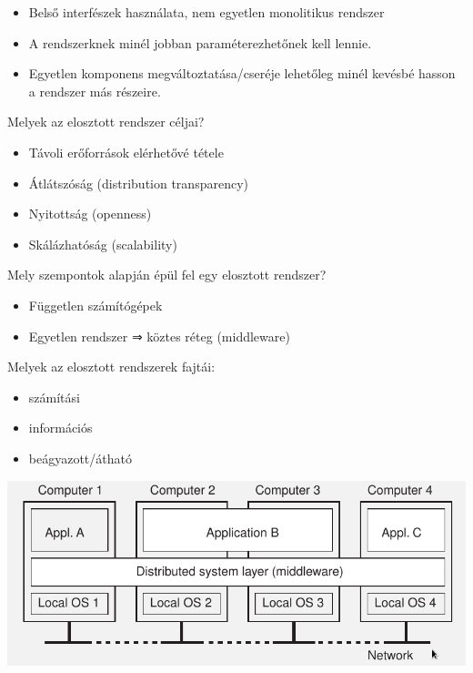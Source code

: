 \documentclass[12pt]{article}
\begin{document}
\begin{description}
\begin{itemize}
            \item Belső interfészek használata, nem egyetlen monolitikus rendszer
            \item A rendszerknek minél jobban paraméterezhetőnek kell lennie.
            \item Egyetlen komponens megváltoztatása/cseréje lehetőleg minél
                kevésbé hasson a rendszer más részeire.
        \end{itemize}
    \item Melyek az elosztott rendszer céljai?
        \begin{itemize}
            \item Távoli erőforrások elérhetővé tétele
            \item Átlátszóság (distribution transparency)
            \item Nyitottság (openness)
            \item Skálázhatóság (scalability)
        \end{itemize}
    \item  Mely szempontok alapján épül fel egy elosztott rendszer?
        \begin{itemize}
            \item Független számítógépek
            \item Egyetlen rendszer ⇒ köztes réteg (middleware)
        \end{itemize}
    \item
        Melyek az elosztott rendszerek fajtái:
        \begin{itemize}
            \item
                számítási
            \item
                információs
            \item
                beágyazott/átható
        \end{itemize}
        \begin{center}
            \includegraphics[scale=0.5]{images/ElosztottRendszer.png}
        \end{center}
\end{description}
\end{document}
